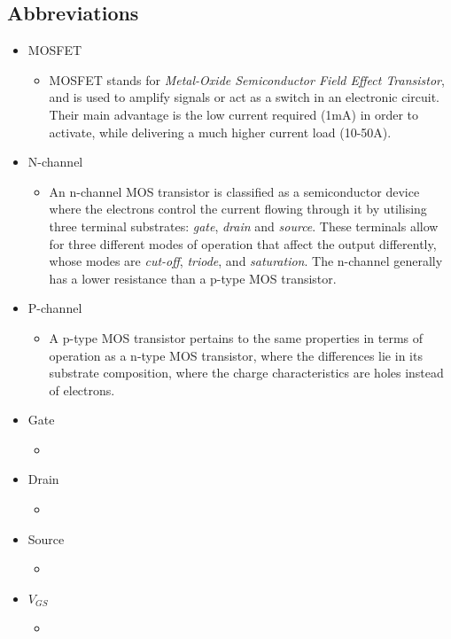 \documentclass[12pt]{article}
\begin{document}
\subsection{Abbreviations}
\begin{itemize}
\item MOSFET
\begin{itemize}
\item MOSFET stands for \emph{Metal-Oxide Semiconductor Field Effect Transistor}, and is used to amplify signals or act as a switch in an electronic circuit. Their main advantage is the low current required (1mA) in order to activate, while delivering a much higher current load (10-50A).
\end{itemize}
\item N-channel
\begin{itemize}
\item An n-channel MOS transistor is classified as a semiconductor device where the electrons control the current flowing through it by utilising three terminal substrates: \emph{gate}, \emph{drain} and \emph{source}. These terminals allow for three different modes of operation that affect the output differently, whose modes are \emph{cut-off}, \emph{triode}, and \emph{saturation}. The n-channel generally has a lower resistance than a p-type MOS transistor. 
\end{itemize}
\item P-channel
\begin{itemize}
\item A p-type MOS transistor pertains to the same properties in terms of operation as a n-type MOS transistor, where the differences lie in its substrate composition, where the charge characteristics are holes instead of electrons.
\end{itemize}
\item Gate
\begin{itemize}
\item 
\end{itemize}
\item Drain
\begin{itemize}
\item 
\end{itemize}
\item Source
\begin{itemize}
\item 
\end{itemize}
\item $V_{GS}$
\begin{itemize}
\item 

\end{itemize}
\end{itemize}
\end{document}
